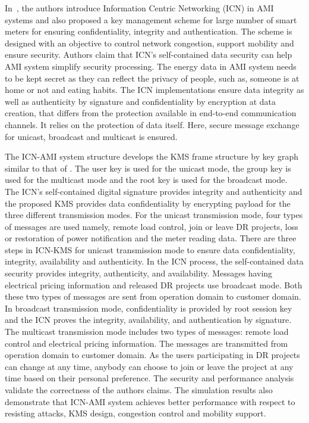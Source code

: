 \par In~\cite{Yu15}, the authors introduce Information Centric Networking (ICN) in AMI systems and also proposed a key management scheme for large number of smart meters for ensuring confidentiality, integrity and authentication. The scheme is designed with an objective to control network congestion, support mobility and ensure security. Authors claim that ICN's self-contained data security can help AMI system simplify security processing. The energy data in AMI system needs to be kept secret as they can reflect the privacy of people, such as, someone is at home or not and eating habits. The ICN implementations ensure data integrity as well as authenticity by signature and confidentiality by encryption at data creation, that differs from the protection available in end-to-end communication channels. It relies on the protection of data itself. Here, secure message exchange for unicast, broadcast and multicast is ensured. 
\par The ICN-AMI system structure develops the KMS frame structure by key graph similar to that of \cite{Wong00}. The user key is used for the unicast mode, the group key is used for the multicast mode and the root key is used for the broadcast mode. The ICN's self-contained digital signature provides integrity and authenticity and the proposed KMS provides data confidentiality by encrypting payload for the three different transmission modes. For the unicast transmission mode, four types of messages are used namely, remote load control, join or leave DR projects, loss or restoration of power notification and the meter reading data. There are three steps in ICN-KMS for unicast transmission mode to ensure data confidentiality, integrity, availability and authenticity. In the ICN process, the self-contained data security provides integrity, authenticity, and availability. Messages having electrical pricing information and released DR projects use broadcast mode. Both these two types of messages are sent from operation domain to customer domain. In broadcast transmission mode, confidentiality is provided by root session key and the ICN proves the integrity, availability, and authentication by signature. The multicast transmission mode includes two types of messages: remote load control and electrical pricing information. The messages are transmitted from operation domain to customer domain. As the users participating in DR projects can change at any time, anybody can choose to join or leave the project at any time based on their personal preference. The security and performance analysis validate the correctness of the authors claims. The simulation results also demonstrate that ICN-AMI system achieves better performance with respect to resisting attacks, KMS design, congestion control and mobility support. 


